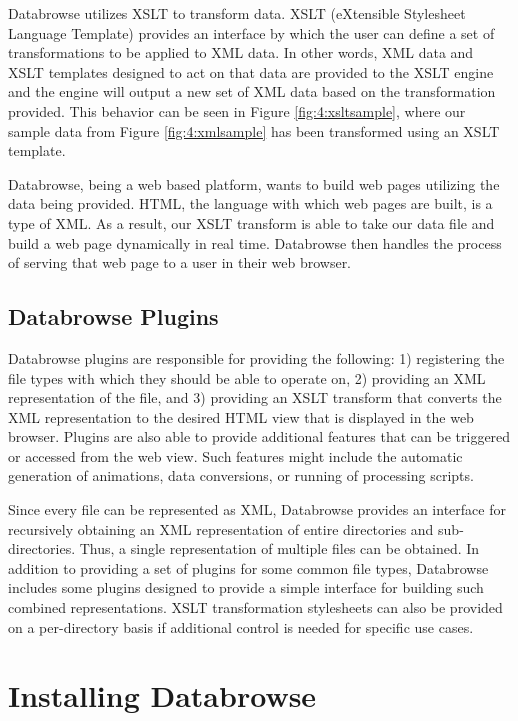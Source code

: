 \documentclass[10pt]{article}
\begin{document}
Databrowse utilizes XSLT to transform data.  XSLT (eXtensible Stylesheet Language Template) provides an interface by which the user can define a set of transformations to be applied to XML data.  In other words, XML data and XSLT templates designed to act on that data are provided to the XSLT engine and the engine will output a new set of XML data based on the transformation provided.  This behavior can be seen in Figure \ref{fig:4:xsltsample}, where our sample data from Figure \ref{fig:4:xmlsample} has been transformed using an XSLT template.

Databrowse, being a web based platform, wants to build web pages utilizing the data being provided.  HTML, the language with which web pages are built, is a type of XML.  As a result, our XSLT transform is able to take our data file and build a web page dynamically in real time.  Databrowse then handles the process of serving that web page to a user in their web browser.

\subsection{Databrowse Plugins}

Databrowse plugins are responsible for providing the following:  1) registering the file types with which they should be able to operate on, 2) providing an XML representation of the file, and 3) providing an XSLT transform that converts the XML representation to the desired HTML view that is displayed in the web browser.  Plugins are also able to provide additional features that can be triggered or accessed from the web view.  Such features might include the automatic generation of animations, data conversions, or running of processing scripts.

Since every file can be represented as XML, Databrowse provides an interface for recursively obtaining an XML representation of entire directories and sub-directories.  Thus, a single representation of multiple files can be obtained.  In addition to providing a set of plugins for some common file types, Databrowse includes some plugins designed to provide a simple interface for building such combined representations.  XSLT transformation stylesheets can also be provided on a per-directory basis if additional control is needed for specific use cases.

\clearpage
\section{Installing Databrowse}
\end{document}
